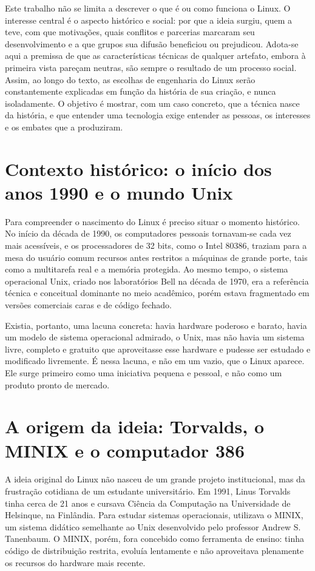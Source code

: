 \documentclass[12pt]{article}
\begin{document}
Este trabalho não se limita a descrever o que é ou como funciona o Linux. O
interesse central é o aspecto histórico e social: por que a ideia surgiu, quem a
teve, com que motivações, quais conflitos e parcerias marcaram seu
desenvolvimento e a que grupos sua difusão beneficiou ou prejudicou. Adota-se
aqui a premissa de que as características técnicas de qualquer artefato, embora à
primeira vista pareçam neutras, são sempre o resultado de um processo social.
Assim, ao longo do texto, as escolhas de engenharia do Linux serão
constantemente explicadas em função da história de sua criação, e nunca
isoladamente. O objetivo é mostrar, com um caso concreto, que a técnica nasce da
história, e que entender uma tecnologia exige entender as pessoas, os interesses
e os embates que a produziram.

\section{Contexto histórico: o início dos anos 1990 e o mundo Unix}

Para compreender o nascimento do Linux é preciso situar o momento histórico. No
início da década de 1990, os computadores pessoais tornavam-se cada vez mais
acessíveis, e os processadores de 32 bits, como o Intel 80386, traziam para a
mesa do usuário comum recursos antes restritos a máquinas de grande porte, tais
como a multitarefa real e a memória protegida. Ao mesmo tempo, o sistema
operacional Unix, criado nos laboratórios Bell na década de 1970, era a
referência técnica e conceitual dominante no meio acadêmico, porém estava
fragmentado em versões comerciais caras e de código fechado.

Existia, portanto, uma lacuna concreta: havia hardware poderoso e barato, havia
um modelo de sistema operacional admirado, o Unix, mas não havia um sistema
livre, completo e gratuito que aproveitasse esse hardware e pudesse ser estudado
e modificado livremente. É nessa lacuna, e não em um vazio, que o Linux aparece.
Ele surge primeiro como uma iniciativa pequena e pessoal, e não como um produto
pronto de mercado.

\section{A origem da ideia: Torvalds, o MINIX e o computador 386}

A ideia original do Linux não nasceu de um grande projeto institucional, mas da
frustração cotidiana de um estudante universitário. Em 1991, Linus Torvalds
tinha cerca de 21 anos e cursava Ciência da Computação na Universidade de
Helsinque, na Finlândia. Para estudar sistemas operacionais, utilizava o MINIX,
um sistema didático semelhante ao Unix desenvolvido pelo professor Andrew S.
Tanenbaum. O MINIX, porém, fora concebido como ferramenta de ensino: tinha
código de distribuição restrita, evoluía lentamente e não aproveitava plenamente
os recursos do hardware mais recente.
\end{document}
